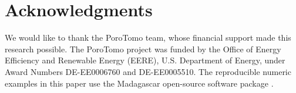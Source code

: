 \section{Acknowledgments}
We would like to thank the PoroTomo team, whose financial support made this research possible. The PoroTomo project was funded by the Office of Energy Efficiency and Renewable Energy (EERE), U.S. Department of Energy, under Award Numbers DE-EE0006760 and  DE-EE0005510. The reproducible numeric examples in this paper use the Madagascar open-source software package \citep{fomel2013madagascar}.



